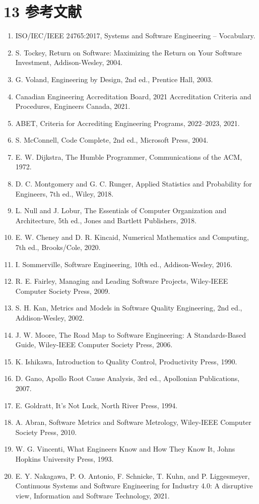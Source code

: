 \documentclass[uplatex,dvipdfmx,a4paper,11pt]{jsarticle}
\begin{document}
\section{13 参考文献}
\begin{enumerate}[leftmargin=2em]
\item ISO/IEC/IEEE 24765:2017, Systems and Software Engineering – Vocabulary.
\item S. Tockey, Return on Software: Maximizing the Return on Your Software Investment, Addison-Wesley, 2004.
\item G. Voland, Engineering by Design, 2nd ed., Prentice Hall, 2003.
\item Canadian Engineering Accreditation Board, 2021 Accreditation Criteria and Procedures, Engineers Canada, 2021.
\item ABET, Criteria for Accrediting Engineering Programs, 2022–2023, 2021.
\item S. McConnell, Code Complete, 2nd ed., Microsoft Press, 2004.
\item E. W. Dijkstra, The Humble Programmer, Communications of the ACM, 1972.
\item D. C. Montgomery and G. C. Runger, Applied Statistics and Probability for Engineers, 7th ed., Wiley, 2018.
\item L. Null and J. Lobur, The Essentials of Computer Organization and Architecture, 5th ed., Jones and Bartlett Publishers, 2018.
\item E. W. Cheney and D. R. Kincaid, Numerical Mathematics and Computing, 7th ed., Brooks/Cole, 2020.
\item I. Sommerville, Software Engineering, 10th ed., Addison-Wesley, 2016.
\item R. E. Fairley, Managing and Leading Software Projects, Wiley-IEEE Computer Society Press, 2009.
\item S. H. Kan, Metrics and Models in Software Quality Engineering, 2nd ed., Addison-Wesley, 2002.
\item J. W. Moore, The Road Map to Software Engineering: A Standards-Based Guide, Wiley-IEEE Computer Society Press, 2006.
\item K. Ishikawa, Introduction to Quality Control, Productivity Press, 1990.
\item D. Gano, Apollo Root Cause Analysis, 3rd ed., Apollonian Publications, 2007.
\item E. Goldratt, It’s Not Luck, North River Press, 1994.
\item A. Abran, Software Metrics and Software Metrology, Wiley-IEEE Computer Society Press, 2010.
\item W. G. Vincenti, What Engineers Know and How They Know It, Johns Hopkins University Press, 1993.
\item E. Y. Nakagawa, P. O. Antonio, F. Schnicke, T. Kuhn, and P. Liggesmeyer, Continuous Systems and Software Engineering for Industry 4.0: A disruptive view, Information and Software Technology, 2021.
\end{enumerate}
\end{document}
